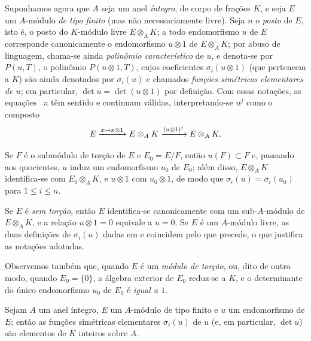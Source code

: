 \documentclass[oneside,10pt]{amsart}
\makeatletter
\renewcommand{\leq}{\leqslant}
\newcommand{\ega@arrow}[2]{\mathchoice{#1}{#2}{#2}{#2}}
\let\ega@shortmapsto\mapsto
\renewcommand{\mapsto}{\ega@arrow{\longmapsto}{\ega@shortmapsto}}
\let\EGAOriginalLabel\label
\renewcommand{\label}[1]{\phantomsection\EGAOriginalLabel{#1}}
\makeatother
\begin{document}
\begin{env}[6.4.2]
\label{II.6.4.2}
Suponhamos agora que $A$ seja um anel \emph{íntegro}, de corpo de frações $K$, e seja $E$ um $A$-módulo \emph{de tipo finito} (mas não necessariamente livre).
Seja $n$ o \emph{posto} de $E$, isto é, o posto do $K$-módulo livre $E\otimes_A K$;
a todo endomorfismo $u$ de $E$ corresponde canonicamente o endomorfismo $u\otimes1$ de $E\otimes_A K$;
por abuso de linguagem, chama-se ainda \emph{polinômio característico} de $u$, e denota-se por $P(u,T)$, o polinômio $P(u\otimes1,T)$, cujos coeficientes $\sigma_i(u\otimes1)$ (que pertencem a $K$) são ainda denotados por $\sigma_i(u)$ e chamados \emph{funções simétricas elementares de $u$};
em particular, $\det u=\det(u\otimes1)$ por definição.
Com essas notações, as equações~ a  têm sentido e continuam válidas, interpretando-se $u^j$ como o composto
\[
  E\xrightarrow{x\mapsto x\otimes1}E\otimes_A K
   \xrightarrow{(u\otimes1)^j}E\otimes_A K.
\]

Se $F$ é o submódulo de torção de $E$ e $E_0=E/F$, então $u(F)\subset F$ e, passando aos quocientes, $u$ induz um endomorfismo $u_0$ de $E_0$;
além disso, $E\otimes_A K$ identifica-se com $E_0\otimes_A K$, e $u\otimes1$ com $u_0\otimes1$, de modo que $\sigma_i(u)=\sigma_i(u_0)$ para $1\leq i\leq n$.

Se $E$ é \emph{sem torção}, então $E$ identifica-se canonicamente com um sub-$A$-módulo de $E\otimes_A K$, e a relação $u\otimes1=0$ equivale a $u=0$.
Se $E$ é um $A$-módulo livre, as duas definições de $\sigma_i(u)$ dadas em  e  coincidem pelo que precede, o que justifica as notações adotadas.

Observemos também que, quando $E$ é um \emph{módulo de torção}, ou, dito de outro modo, quando $E_0=\{0\}$, a álgebra exterior de $E_0$ reduz-se a $K$, e o determinante do único endomorfismo $u_0$ de $E_0$ é \emph{igual a $1$}.
\end{env}

\begin{proposition}[6.4.3]
\label{II.6.4.3}
Sejam $A$ um anel íntegro, $E$ um $A$-módulo de tipo finito e $u$ um endomorfismo de $E$;
então as funções simétricas elementares $\sigma_i(u)$ de $u$ (e, em particular, $\det u$) são elementos de $K$ inteiros sobre $A$.
\end{proposition}
\end{document}
